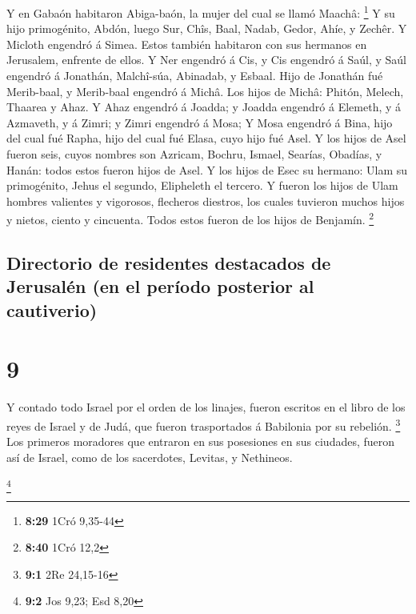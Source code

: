  Y en Gabaón habitaron Abiga-baón, la mujer del cual se
llamó Maachâ: \footnote{\textbf{8:29} 1Cró 9,35-44}  Y su
hijo primogénito, Abdón, luego Sur, Chîs, Baal, Nadab, 
Gedor, Ahíe, y Zechêr.  Y Micloth engendró á Simea. Estos
también habitaron con sus hermanos en Jerusalem, enfrente de ellos.
 Y Ner engendró á Cis, y Cis engendró á Saúl, y Saúl
engendró á Jonathán, Malchî-súa, Abinadab, y Esbaal.  Hijo
de Jonathán fué Merib-baal, y Merib-baal engendró á Michâ. 
Los hijos de Michâ: Phitón, Melech, Thaarea y Ahaz.  Y Ahaz
engendró á Joadda; y Joadda engendró á Elemeth, y á Azmaveth, y á Zimri;
y Zimri engendró á Mosa;  Y Mosa engendró á Bina, hijo del
cual fué Rapha, hijo del cual fué Elasa, cuyo hijo fué Asel.
 Y los hijos de Asel fueron seis, cuyos nombres son
Azricam, Bochru, Ismael, Searías, Obadías, y Hanán: todos estos fueron
hijos de Asel.  Y los hijos de Esec su hermano: Ulam su
primogénito, Jehus el segundo, Elipheleth el tercero.  Y
fueron los hijos de Ulam hombres valientes y vigorosos, flecheros
diestros, los cuales tuvieron muchos hijos y nietos, ciento y cincuenta.
Todos estos fueron de los hijos de Benjamín. \footnote{\textbf{8:40}
  1Cró 12,2}

\hypertarget{directorio-de-residentes-destacados-de-jerusaluxe9n-en-el-peruxedodo-posterior-al-cautiverio}{%
\subsection{Directorio de residentes destacados de Jerusalén (en el
período posterior al
cautiverio)}\label{directorio-de-residentes-destacados-de-jerusaluxe9n-en-el-peruxedodo-posterior-al-cautiverio}}

\hypertarget{section-8}{%
\section{9}\label{section-8}}

 Y contado todo Israel por el orden de los linajes, fueron
escritos en el libro de los reyes de Israel y de Judá, que fueron
trasportados á Babilonia por su rebelión. \footnote{\textbf{9:1} 2Re
  24,15-16}  Los primeros moradores que entraron en sus
posesiones en sus ciudades, fueron así de Israel, como de los
sacerdotes, Levitas, y Nethineos.

\footnote{\textbf{9:2} Jos 9,23; Esd 8,20}

